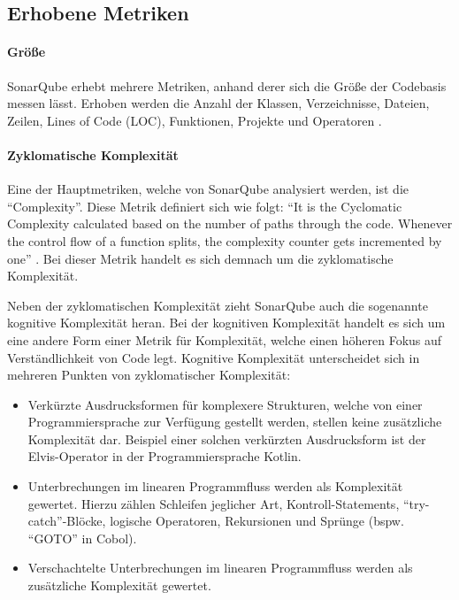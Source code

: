 \documentclass[a4paper, 12pt]{article}
\begin{document}
\subsection{Erhobene Metriken}


\paragraph{Größe}
SonarQube erhebt mehrere Metriken, anhand derer sich die Größe der Codebasis messen lässt.
Erhoben werden die Anzahl der Klassen, Verzeichnisse, Dateien, Zeilen, Lines of Code (LOC), Funktionen, Projekte und Operatoren \parencite{sonarqube_metric_definitions}.

\paragraph{Zyklomatische Komplexität}
Eine der Hauptmetriken, welche von SonarQube analysiert werden, ist die \enquote{Complexity}.
Diese Metrik definiert sich wie folgt: \enquote{It is the Cyclomatic Complexity calculated based on the number of paths through the code. Whenever the control flow of a function splits, the complexity counter gets incremented by one} \parencite{sonarqube_metric_definitions}.
Bei dieser Metrik handelt es sich demnach um die zyklomatische Komplexität.

Neben der zyklomatischen Komplexität zieht SonarQube auch die sogenannte kognitive Komplexität heran.
Bei der kognitiven Komplexität handelt es sich um eine andere Form einer Metrik für Komplexität, welche einen höheren Fokus auf Verständlichkeit von Code legt.
Kognitive Komplexität unterscheidet sich in mehreren Punkten von zyklomatischer Komplexität:
\begin{itemize}
    \item Verkürzte Ausdrucksformen für komplexere Strukturen, welche von einer Programmiersprache zur Verfügung gestellt werden, stellen keine zusätzliche Komplexität dar. Beispiel einer solchen verkürzten Ausdrucksform ist der Elvis-Operator in der Programmiersprache Kotlin.
    \item Unterbrechungen im linearen Programmfluss werden als Komplexität gewertet. Hierzu zählen Schleifen jeglicher Art, Kontroll-Statements, \enquote{try-catch}-Blöcke, logische Operatoren, Rekursionen und Sprünge (bspw. \enquote{GOTO} in Cobol).
    \item Verschachtelte Unterbrechungen im linearen Programmfluss werden als zusätzliche Komplexität gewertet.
\end{itemize}
\parencite{Cognitive_Complexity}
\end{document}
